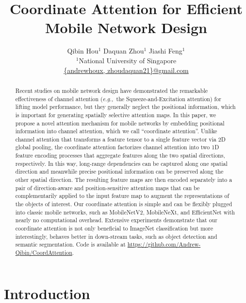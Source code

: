 \documentclass[final]{cvpr}
\def\eg{\emph{e.g.,~}}
\begin{document}
\title{Coordinate Attention for Efficient Mobile Network Design}

\author{Qibin Hou$^1$ \qquad Daquan Zhou$^1$ \qquad Jiashi Feng$^1$ \\
  $^1$National University of Singapore \\
  \small \url{{andrewhoux, zhoudaquan21}@gmail.com}
}

\maketitle
\thispagestyle{empty}

\begin{abstract}
Recent studies on mobile network design have demonstrated the remarkable effectiveness of channel attention (\eg the Squeeze-and-Excitation attention) for lifting model performance, but they generally neglect the positional information, which is important for generating spatially selective attention maps.
%
In this paper, we propose a novel attention mechanism for mobile networks by embedding positional information into channel attention, which we call ``coordinate attention''.
Unlike channel attention that transforms a feature tensor to a single feature vector via 2D global pooling, the coordinate attention factorizes channel attention into two 1D feature encoding processes that aggregate features along the two spatial directions, respectively.
%
In this way, long-range dependencies can be captured along one spatial direction and meanwhile precise positional information can be preserved along the other spatial direction.
%
The resulting feature maps are then encoded separately into a pair of direction-aware and position-sensitive attention maps that can be complementarily applied to the input feature map to augment the representations of the objects of interest.
%
Our coordinate attention is simple and can be flexibly plugged into classic mobile networks, such as MobileNetV2,
MobileNeXt, and EfficientNet with nearly no computational overhead.
%
Extensive experiments demonstrate that our coordinate attention is not only beneficial to ImageNet classification but more interestingly, behaves better in down-stream tasks, such as object detection and semantic segmentation.
%
Code is available at \url{https://github.com/Andrew-Qibin/CoordAttention}.

\end{abstract}

\section{Introduction} \label{sec:introduction}
\end{document}
